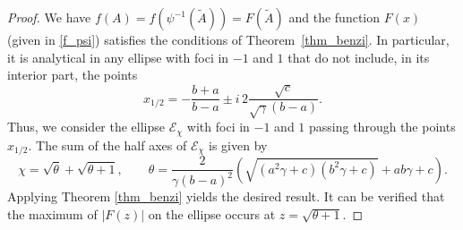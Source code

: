 \documentclass{article}
\begin{document}
\begin{proof}
We have $f(A)=f(\psi^{-1}(\widetilde A))=F(\widetilde A)$ and the function $F(x)$ (given in \eqref{f_psi}) satisfies the conditions of Theorem~\ref{thm_benzi}. 
In particular, it is analytical in any ellipse with foci in $-1$ and $1$ that do not include, in its interior part, the points
$$
x_{1/2} = -\frac{b+a}{b-a} \pm i \, 2 \frac{\sqrt{c}}{\sqrt{\gamma}(b-a)}.
$$
Thus, we consider the ellipse $\mathcal{E}_\chi$ with foci in $-1$ and $1$ passing through the points $x_{1/2}$. The sum of the half axes of $\mathcal{E}_\chi$ is given by
$$
\chi = \sqrt{\theta} + \sqrt{\theta+1}, \qquad \theta=\frac{2}{\gamma (b-a)^2}\left(\sqrt{(a^2 \gamma+c)(b^2 \gamma +c)}+ab \gamma +c\right).
$$
Applying Theorem \ref{thm_benzi} yields the desired result. It can be verified that the maximum of $|F(z)|$ on the ellipse occurs at $z = \sqrt{\theta+1}$.
\end{proof}
\end{document}

